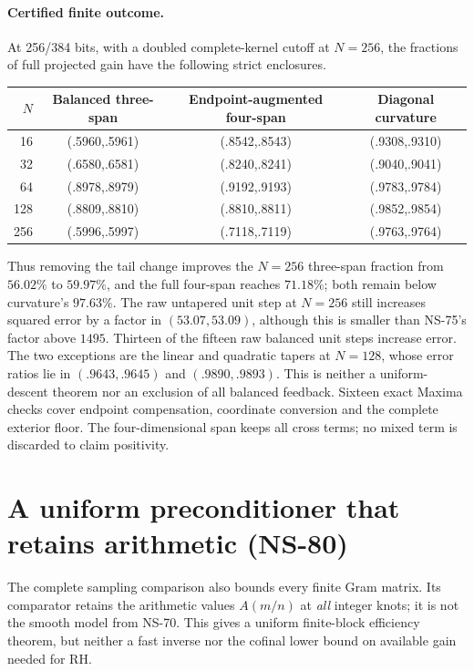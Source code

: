 \paragraph{Certified finite outcome.}
At 256/384 bits, with a doubled complete-kernel cutoff at $N=256$,
the fractions of full projected gain have the following strict enclosures.
\begin{center}
\begin{tabular}{rccc}
\hline
$N$&Balanced three-span&Endpoint-augmented four-span&Diagonal curvature\\
\hline
16&(.5960,.5961)&(.8542,.8543)&(.9308,.9310)\\
32&(.6580,.6581)&(.8240,.8241)&(.9040,.9041)\\
64&(.8978,.8979)&(.9192,.9193)&(.9783,.9784)\\
128&(.8809,.8810)&(.8810,.8811)&(.9852,.9854)\\
256&(.5996,.5997)&(.7118,.7119)&(.9763,.9764)\\
\hline
\end{tabular}
\end{center}
Thus removing the tail change improves the $N=256$ three-span fraction
from $56.02\%$ to $59.97\%$, and the full four-span reaches $71.18\%$;
both remain below curvature's $97.63\%$. The raw untapered unit step
at $N=256$ still increases squared error by a factor in $(53.07,53.09)$,
although this is smaller than NS-75's factor above $1495$.
Thirteen of the fifteen raw balanced unit steps increase error. The two
exceptions are the linear and quadratic tapers at $N=128$, whose error
ratios lie in $(.9643,.9645)$ and $(.9890,.9893)$. This is neither a
uniform-descent theorem nor an exclusion of all balanced feedback.
Sixteen exact Maxima checks cover endpoint compensation, coordinate
conversion and the complete exterior floor. The four-dimensional span
keeps all cross terms; no mixed term is discarded to claim positivity.

\section{A uniform preconditioner that retains arithmetic (NS-80)}
\label{sec:ns80-arithmetic-preconditioner}

The complete sampling comparison also bounds every finite Gram matrix.
Its comparator retains the arithmetic values $A(m/n)$ at \emph{all}
integer knots; it is not the smooth model from NS-70. This gives a
uniform finite-block efficiency theorem, but neither a fast inverse
nor the cofinal lower bound on available gain needed for RH.

